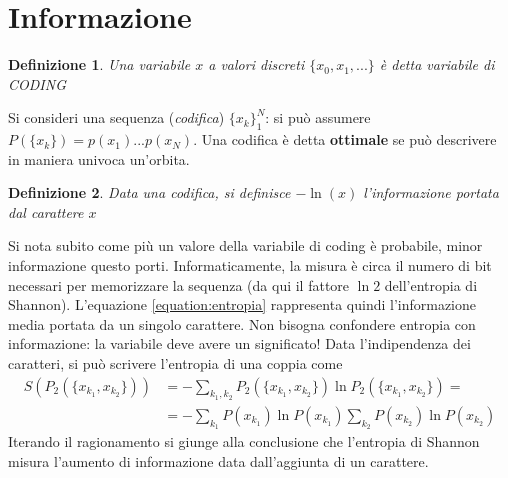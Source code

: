 \documentclass[12pt, a4paper]{book}
\theoremstyle{theorem}
\newtheorem{definition}{Definizione}[section]
\begin{document}
		\section{Informazione}
			\begin{definition}
				Una variabile $x$ a valori discreti $\{x_0,x_1,...\}$ è detta variabile di CODING
			\end{definition}
			Si consideri una sequenza (\textit{codifica}) $\{x_k\}_1^N$: si può assumere $P(\{x_k\})=p(x_1)...p(x_N)$.
			Una codifica è detta \textbf{ottimale} se può descrivere in maniera univoca un'orbita.
			\begin{definition}
				Data una codifica, si definisce $-\ln(x)$ l'informazione portata dal carattere $x$
			\end{definition}
			Si nota subito come più un valore della variabile di coding è probabile, minor informazione questo porti.
			Informaticamente, la misura è circa il numero di bit necessari per memorizzare la sequenza (da qui il fattore $\ln2$ dell'entropia di Shannon).
			L'equazione \ref{equation:entropia} rappresenta quindi l'informazione media portata da un singolo carattere.
			Non bisogna confondere entropia con informazione: la variabile deve avere un significato!
			Data l'indipendenza dei caratteri, si può scrivere l'entropia di una coppia come
			\begin{equation*}
				\begin{split}
					S\left(P_{2}\left(\{x_{k_{1}},x_{k_{2}}\}\right)\right)&=-\sum_{k_{1},k_{2}}P_{2}\left(\{x_{k_{1}},x_{k_{2}}\}\right)\ln{P_{2}\left(\{x_{k_{1}},x_{k_{2}}\}\right)}=\\
					&=-\sum_{k_{1}}P\left(x_{k_{1}}\right)\ln{P\left(x_{k_{1}}\right)}\sum_{k_{2}}P\left(x_{k_{2}}\right)\ln{P\left(x_{k_{2}}\right)}
				\end{split}
			\end{equation*}
			Iterando il ragionamento si giunge alla conclusione che l'entropia di Shannon misura l'aumento di informazione data dall'aggiunta di un carattere.
\end{document}
